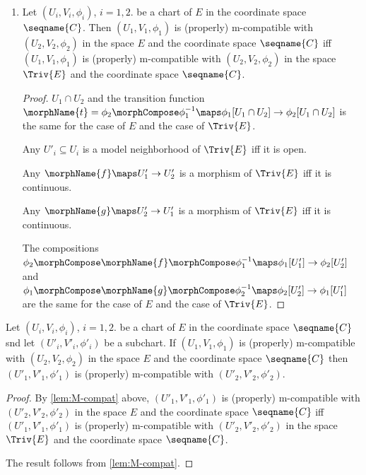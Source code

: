 \documentclass{article}
\begin{document}
\begin{lemma}[M-compatibility]
\label{lem:M-compat}
\mbox{}
\begin{enumerate}
\item
Let $(U_i,V_i,\phi_i)$, $i=1,2$. be a chart of $E$ in the coordinate
space $\seqname{C}$. Then $(U_1, V_1, \phi_1)$ is (properly)
m-compatible with
\nobreaks
  {{
    $(U_2, V_2, \phi_2)$
  }}
in the space $E$ and the coordinate space $\seqname{C}$ iff
$(U_1, V_1, \phi_1)$ is (properly) m-compatible with
\nobreaks
  {{
    $(U_2, V_2, \phi_2)$
  }}
in the space $\Triv{E}$ and the coordinate space $\seqname{C}$.

\begin{proof}
$U_1 \cap U_2$ and the transition function
\nobreaks
  {{
    $
      \morphName{t}=\phi_2 \morphCompose \phi^{-1}_1
      \maps \phi_1[U_1 \cap U_2] \to \phi_2[U_1 \cap U_2]
$
}}
is the same for the case of $E$ and the case of $\Triv{E}$.

Any
$U'_i \subseteq U_i$ is a model neighborhood of $\Triv{E}$ iff it is open.

Any $\morphName{f} \maps U'_1 \to U'_2$ is a morphism of $\Triv{E}$ iff
it is continuous.

Any $\morphName{g} \maps U'_2 \to U'_1$ is a morphism of $\Triv{E}$ iff
it is continuous.

The compositions
$
  \phi_2 \morphCompose \morphName{f} \morphCompose \phi^{-1}_1
  \maps \phi_1[U'_1] \to \phi_2[U'_2]
$
and
$
  \phi_1 \morphCompose \morphName{g} \morphCompose \phi^{-1}_2
  \maps \phi_2[U'_2] \to \phi_1[U'_1]
$
are the same for the case of $E$ and the case of $\Triv{E}$.
\end{proof}
\end{enumerate}
\end{lemma}

\begin{corollary}
\label{cor:M-compat}
Let $(U_i,V_i,\phi_i)$, $i=1,2$. be a chart of $E$ in the coordinate
space $\seqname{C}$ snd let $(U'_i,V'_i,\phi'_i)$ be a subchart. If
$(U_1,V_1,\phi_1)$ is (properly) m-compatible with $(U_2,V_2,\phi_2)$
in the space $E$ and the coordinate space $\seqname{C}$ then
$(U'_1,V'_1,\phi'_1)$ is (properly) m-compatible with
$(U'_2,V'_2,\phi'_2)$.

\begin{proof}
By \cref{lem:M-compat} above, $(U'_1,V'_1,\phi'_1)$ is (properly)
m-compatible with $(U'_2,V'_2,\phi'_2)$ in the space $E$ and the
coordinate space $\seqname{C}$ iff $(U'_1,V'_1,\phi'_1)$ is (properly)
m-compatible with $(U'_2,V'_2,\phi'_2)$ in the space $\Triv{E}$ and the
coordinate space $\seqname{C}$.

The result follows from \cref{lem:M-compat}.
\end{proof}
\end{corollary}
\end{document}
